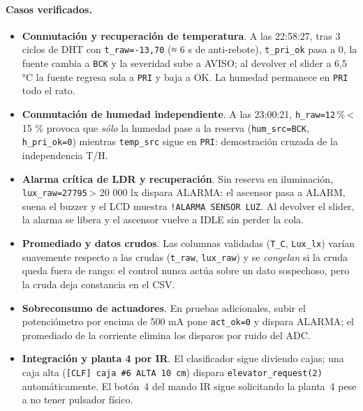 \paragraph{Casos verificados.}

\begin{itemize}
  \item \textbf{Conmutación y recuperación de temperatura}. A las 22:58:27,
        tras 3 ciclos de DHT con \texttt{t\_raw=-13,70} (≈ 6 s
        de anti-rebote), \texttt{t\_pri\_ok} pasa a 0, la fuente cambia a
        \texttt{BCK} y la severidad sube a \textsf{AVISO}; al devolver el
        slider a 6,5 °C la fuente regresa sola a \texttt{PRI} y
        baja a \textsf{OK}. La humedad permanece en \texttt{PRI} todo el rato.
  \item \textbf{Conmutación de humedad independiente}. A las 23:00:21,
        \texttt{h\_raw=12}\,\%\,< 15 \% provoca que \emph{sólo}
        la humedad pase a la reserva (\texttt{hum\_src=BCK},
        \texttt{h\_pri\_ok=0}) mientras \texttt{temp\_src} sigue en
        \texttt{PRI}: demostración cruzada de la independencia T/H.
  \item \textbf{Alarma crítica de LDR y recuperación}. Sin reserva en
        iluminación, \texttt{lux\_raw=27795}\,> 20 000 lx dispara
        \textsf{ALARMA}: el ascensor pasa a \textsf{ALARM}, suena el buzzer
        y el LCD muestra \texttt{!ALARMA SENSOR LUZ}. Al devolver el slider,
        la alarma se libera y el ascensor vuelve a \textsf{IDLE} sin perder
        la cola.
  \item \textbf{Promediado y datos crudos}. Las columnas validadas
        (\texttt{T\_C}, \texttt{Lux\_lx}) varían suavemente respecto a las
        crudas (\texttt{t\_raw}, \texttt{lux\_raw}) y se \emph{congelan} si
        la cruda queda fuera de rango: el control nunca actúa sobre un dato
        sospechoso, pero la cruda deja constancia en el CSV.
  \item \textbf{Sobreconsumo de actuadores}. En pruebas adicionales, subir el
        potenciómetro por encima de 500 mA pone
        \texttt{act\_ok=0} y dispara \textsf{ALARMA}; el promediado de la
        corriente elimina los disparos por ruido del ADC.
  \item \textbf{Integración y planta 4 por IR}. El clasificador sigue
        diviendo cajas; una caja alta (\texttt{[CLF] caja \#6 ALTA 10 cm})
        dispara \texttt{elevator\_request(2)} automáticamente. El botón~4
        del mando IR sigue solicitando la planta~4 pese a no tener pulsador
        físico.
\end{itemize}

